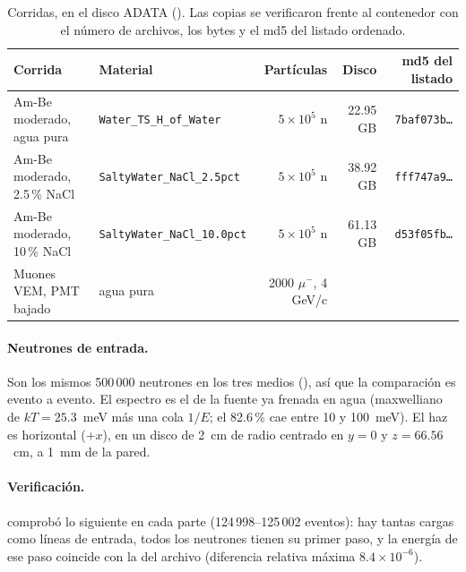 \documentclass[11pt,a4paper]{article}
\begin{document}
\begin{table}[H]\centering\footnotesize
\begin{tabular}{llrrr}
\toprule
Corrida & Material & Partículas & Disco & md5 del listado \\
\midrule
Am-Be moderado, agua pura & \texttt{Water\_TS\_H\_of\_Water} & $5\times10^5$ n & 22.95 GB & \texttt{7baf073b\ldots} \\
Am-Be moderado, 2.5\,\% NaCl & \texttt{SaltyWater\_NaCl\_2.5pct} & $5\times10^5$ n & 38.92 GB & \texttt{fff747a9\ldots} \\
Am-Be moderado, 10\,\% NaCl & \texttt{SaltyWater\_NaCl\_10.0pct} & $5\times10^5$ n & 61.13 GB & \texttt{d53f05fb\ldots} \\
Muones VEM, PMT bajado & agua pura & 2000 $\mu^-$, 4 GeV/c & & \\
\bottomrule
\end{tabular}
\caption{Corridas, en el disco ADATA (). Las copias se
verificaron frente al contenedor con el número de archivos, los bytes y el md5 del listado ordenado.}
\end{table}

\paragraph{Neutrones de entrada.} Son los mismos 500\,000 neutrones en los tres medios
(), así que la comparación es evento a evento.
El espectro es el de la fuente ya frenada en agua (maxwelliano de $kT=25.3$~meV más una cola $1/E$; el 82.6\,\%
cae entre 10 y 100~meV). El haz es horizontal ($+x$), en un disco de 2~cm de radio centrado en $y=0$ y
$z=66.56$~cm, a 1~mm de la pared.

\paragraph{Verificación.}  comprobó lo siguiente en cada parte (124\,998--125\,002
eventos): hay tantas cargas como líneas de entrada, todos los neutrones tienen su primer paso, y la energía de
ese paso coincide con la del archivo (diferencia relativa máxima $8.4\times10^{-6}$).
\end{document}

